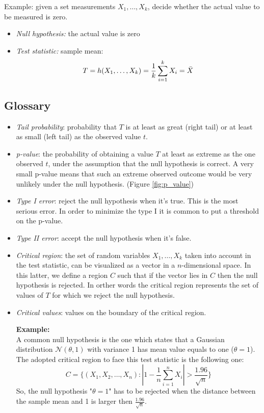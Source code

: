 Example: given a set measurements $X_{1}, \hdots, X_{k}$, decide whether the actual
value to be measured is zero.
\begin{itemize}
	\item \textit{Null hypothesis:} the actual value is zero

	\item \textit{Test statistic:} sample mean:
		\[
			T = h(X_{1}, \hdots , X_{k}) = \frac{1}{k}\sum_{i=1}^{k}X_{i}= \Bar{X}
		\]
\end{itemize}

\subsection{Glossary}
\begin{itemize}
	\item \textit{Tail probability}: probability that $T$ is at least as great (right
		tail) or at least as small (left tail) as the observed value $t$.

	\item \textit{p-value}: the probability of obtaining a value $T$ at least as extreme
		as the one observed $t$, under the assumption that the null hypothesis is
		correct. A very small p-value means that such an extreme observed outcome would
		be very unlikely under the null hypothesis. (Figure \ref{fig:p_value})

	\item \textit{Type I error}: reject the null hypothesis when it's true. This
		is the most serious error. In order to minimize the type I it is common to put
		a threshold on the p-value.

	\item \textit{Type II error}: accept the null hypothesis when it's false.

	\item \textit{Critical region}: the set of random variables $X_{1}, \hdots, X_{k}$
		taken into account in the test statistic, can be visualized as a vector in a
		$n$-dimensional space. In this latter, we define a region $C$ such that if
		the vector lies in $C$ then the null hypothesis is rejected. In orther words
		the critical region represents the set of values of $T$ for which we reject the
		null hypothesis.

	\item \textit{Critical values}: values on the boundary of the critical region.
		\newline

		\textbf{Example:}\\ A common null hypothesis is the one which states that a Gaussian
		distribution $\mathcal{N}(\theta, 1)$ with variance 1 has mean value equals to
		one ($\theta = 1$). The adopted critical region to face this test statistic
		is the following one:
		\[
			C = \{(X_{1}, X_{2}, \hdots, X_{n}) : |1 - \frac{1}{n}\sum_{i=1}^{n}X_{i}|
			> \frac{1.96}{\sqrt{n}}\}
		\]
		So, the null hypothesis "$\theta = 1$" has to be rejected when the distance
		between the sample mean and 1 is larger then $\frac{1.96}{\sqrt{n}}$.


\end{itemize}
